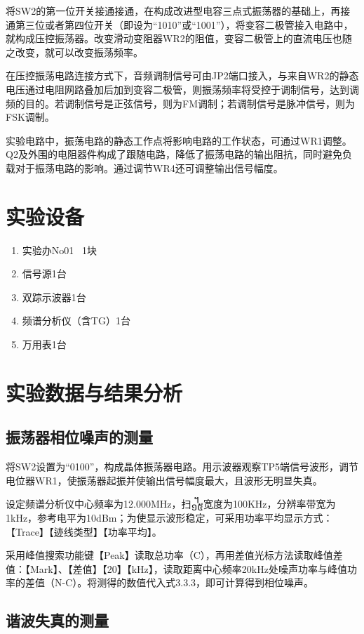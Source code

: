 \documentclass{../source/Experiment}
\begin{document}
将SW2的第一位开关接通接通，在构成改进型电容三点式振荡器的基础上，再接通第三位或者第四位开关（即设为“1010”或“1001”），将变容二极管接入电路中，就构成压控振荡器。改变滑动变阻器WR2的阻值，变容二极管上的直流电压也随之改变，就可以改变振荡频率。

在压控振荡电路连接方式下，音频调制信号可由JP2端口接入，与来自WR2的静态电压通过电阻网路叠加后加到变容二极管，则振荡频率将受控于调制信号，达到调频的目的。若调制信号是正弦信号，则为FM调制；若调制信号是脉冲信号，则为FSK调制。

实验电路中，振荡电路的静态工作点将影响电路的工作状态，可通过WR1调整。Q2及外围的电阻器件构成了跟随电路，降低了振荡电路的输出阻抗，同时避免负载对于振荡电路的影响。通过调节WR4还可调整输出信号幅度。


\section{实验设备}
\begin{enumerate}
    \item 实验办No01 \, 1块
    \item 信号源1台
    \item 双踪示波器1台
    \item 频谱分析仪（含TG）1台
    \item 万用表1台
\end{enumerate}

\section{实验数据与结果分析}
\subsection{振荡器相位噪声的测量}

将SW2设置为“0100”，构成晶体振荡器电路。用示波器观察TP5端信号波形，调节电位器WR1，使振荡器起振并使输出信号幅度最大，且波形无明显失真。

设定频谱分析仪中心频率为12.000MHz，扫᧿宽度为100KHz，分辨率带宽为1kHz，参考电平为10dBm；为使显示波形稳定，可采用功率平均显示方式：【Trace】【迹线类型】【功率平均】。

采用峰值搜索功能键【Peak】读取总功率（C），再用差值光标方法读取峰值差值：【Mark】、【差值】【20】【kHz】，读取距离中心频率20kHz处噪声功率与峰值功率的差值（N-C）。将测得的数值代入式3.3.3，即可计算得到相位噪声。


\subsection{谐波失真的测量}
\end{document}

